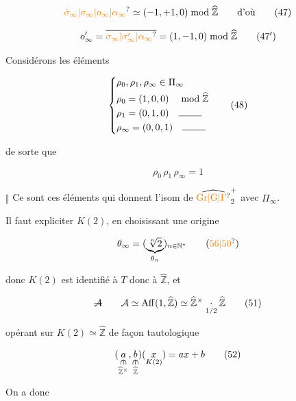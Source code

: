 
\[
\unsure{\dot\sigma_\infty|\sigma_\infty|o_\infty|\alpha_\infty}\simeq(-1,+1,0)\bmod\widehat{\mathbb Z}\qquad\text{d'où}
\tag*{(47)}
\]

\[
o'_\infty=\overline{\unsure{\sigma_\infty|\sigma'_\infty|\alpha_\infty}}=(1,-1,0)\bmod\widehat{\mathbb Z}
\tag*{(47$'$)}
\]

Considérons les éléments

\[
\left\{\begin{aligned}
&\rho_0,\rho_1,\rho_\infty\in\Pi_\infty\\
&\rho_0=(1,0,0)\quad\bmod\widehat{\mathbb Z}\\
&\rho_1=(0,1,0)\quad\rule{2.4em}{0.4pt}\\
&\rho_\infty=(0,0,1)\quad\rule{2.4em}{0.4pt}
\end{aligned}\right.\tag*{(48)}
\]

de sorte que

\[
\rho_0\,\rho_1\,\rho_\infty=1
\tag*{(49)}
\]

$\big\Vert$ Ce sont ces éléments qui donnent l'isom de $\widehat{\unsure{\mathrm{Gr}|\mathrm G|\Gamma}}_2^+$ avec $\Pi_\infty$.



Il faut expliciter $K(2)$,  en choisissant une origine

\[
\theta_\infty=(\underbrace{\sqrt[n]{2}}_{\theta_n})_{n\in\mathbb N^*}
\tag*{(\unsure{56|50})}
\]

donc $K(2)$ est identifié à $T$ donc à $\widehat{\mathbb Z}$, et

\[
\deleted{\mathcal A}\qquad\mathcal A\simeq\operatorname{Aff}(1,\widehat{\mathbb Z})\simeq\widehat{\mathbb Z}^{\times}\underset{1/2}{\cdot}\widehat{\mathbb Z}
\tag*{(51)}
\]

opérant sur $K(2)\simeq\widehat{\mathbb Z}$ de façon tautologique

\[
(\underset{\substack{\rotatebox{-90}{$\in$}\\\widehat{\mathbb Z}^{\times}}}{a},
\underset{\substack{\rotatebox{-90}{$\in$}\\\widehat{\mathbb Z}}}{b})(\underset{K(2)}{x})=ax+b
\tag*{(52)}
\]

On a donc

